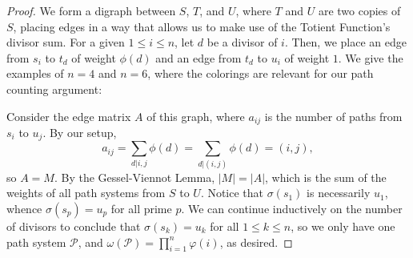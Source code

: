 \documentclass[letterpaper]{article}
\begin{document}
\begin{proof}
    We form a digraph between $S$, $T$, and $U$, where $T$ and $U$ are two copies of $S$, placing edges in a way that allows us to make use of the Totient Function's divisor sum. For a given $1\leq i\leq n$, let $d$ be a divisor of $i$. Then, we place an edge from $s_i$ to $t_d$ of weight $\phi(d)$ and an edge from $t_d$ to $u_i$ of weight $1$. We give the examples of $n=4$ and $n=6$, where the colorings  are relevant for our path counting argument:
    \begin{center}

    \end{center}
    \textcolor{black}
    Consider the edge matrix $A$ of this graph, where $a_{ij}$ is the number of paths from $s_i$ to $u_j$. By our setup, \[a_{ij}=\sum_{d|i,j}\phi(d)=\sum_{d|(i,j)}\phi(d)=(i,j),\] so $A=M$. By the Gessel-Viennot Lemma, $|M|=|A|$, which is the sum of the weights of all path systems from $S$ to $U$. Notice that $\sigma(s_1)$ is necessarily $u_1$, whence $\sigma(s_p)=u_p$ for all prime $p$. We can continue inductively on the number of divisors to conclude that $\sigma(s_k)=u_k$ for all $1\leq k\leq n$, so we only have one path system $\mathscr{P}$, and $\omega(\mathscr{P})=\prod_{i=1}^n\varphi(i)$, as desired.
\end{proof}
\end{document}

